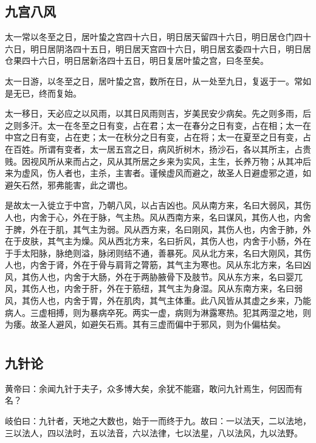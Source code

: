\documentclass[a4paper,12pt,UTF8,twoside]{ctexbook}
\begin{document}
	\chapter{九宫八风}
		
	太一常以冬至之日，居叶蛰之宫四十六日，明日居天留四十六日，明日居仓门四十六日，明日居阴洛四十五日，明日居天宫四十六日，明日居玄委四十六日，明日居仓果四十六日，明日居新洛四十五日，明日复居叶蛰之宫，曰冬至矣。
	
	太一日游，以冬至之日，居叶蛰之宫，数所在日，从一处至九日，复返于一。常如是无已，终而复始。
	
	太一移日，天必应之以风雨，以其日风雨则吉，岁美民安少病矣。先之则多雨，后之则多汗。太一在冬至之日有变，占在君；太一在春分之日有变，占在相；太一在中宫之日有变，占在吏；太一在秋分之日有变，占在将；太一在夏至之日有变，占在百姓。所谓有变者，太一居五宫之日，病风折树木，扬沙石，各以其所主，占贵贱。因视风所从来而占之，风从其所居之乡来为实风，主生，长养万物；从其冲后来为虚风，伤人者也，主杀，主害者。谨候虚风而避之，故圣人日避虚邪之道，如避矢石然，邪弗能害，此之谓也。
	
	是故太一入徙立于中宫，乃朝八风，以占吉凶也。风从南方来，名曰大弱风，其伤人也，内舍于心，外在于脉，气主热。风从西南方来，名曰谋风，其伤人也，内舍于脾，外在于肌，其气主为弱。风从西方来，名曰刚风，其伤人也，内舍于肺，外在于皮肤，其气主为燥。风从西北方来，名曰折风，其伤人也，内舍于小肠，外在于手太阳脉，脉绝则溢，脉闭则结不通，善暴死。风从北方来，名曰大刚风，其伤人也，内舍于肾，外在于骨与肩背之膂筋，其气主为寒也。风从东北方来，名曰凶风，其伤人也，内舍于大肠，外在于两胁腋骨下及肢节。风从东方来，名曰婴兀风，其伤人也，内舍于肝，外在于筋纽，其气主为身湿。风从东南方来，名曰弱风，其伤人也，内舍于胃，外在肌肉，其气主体重。此八风皆从其虚之乡来，乃能病人。三虚相搏，则为暴病卒死。两实一虚，病则为淋露寒热。犯其两湿之地，则为痿。故圣人避风，如避矢石焉。其有三虚而偏中于邪风，则为仆偏枯矣。
	
	\part{}
	\chapter{九针论}
		
	黄帝曰：余闻九针于夫子，众多博大矣，余犹不能寤，敢问九针焉生，何因而有名？
	
	岐伯曰：九针者，天地之大数也，始于一而终于九。故曰：一以法天，二以法地，三以法人，四以法时，五以法音，六以法律，七以法星，八以法风，九以法野。
	
\end{document}
